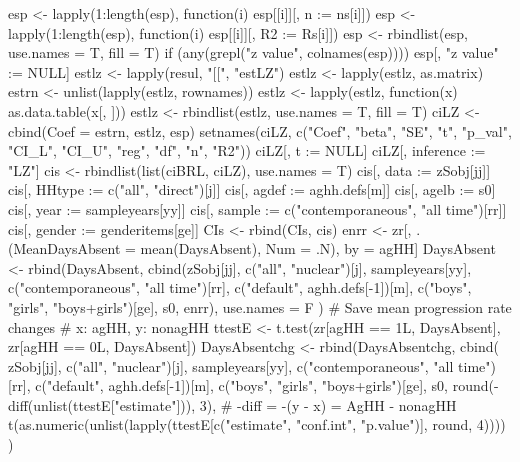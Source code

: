 \begin{Schunk}
\begin{Sinput}
{{{{{{{{                  esp <- lapply(1:length(esp), function(i) esp[[i]][, n := ns[i]])
                  esp <- lapply(1:length(esp), function(i) esp[[i]][, R2 := Rs[i]])
                  esp <- rbindlist(esp, use.names = T, fill = T)
                  if (any(grepl("z value", colnames(esp)))) esp[, "z value" := NULL]
                  estlz <- lapply(resul, "[[", "estLZ")
                  estlz <- lapply(estlz, as.matrix)
                  estrn <- unlist(lapply(estlz, rownames))
                  estlz <- lapply(estlz, function(x) as.data.table(x[, ]))
                  estlz <- rbindlist(estlz, use.names = T, fill = T)
                  ciLZ <- cbind(Coef = estrn, estlz, esp)
                  setnames(ciLZ,  c("Coef", "beta", "SE", "t", "p_val", "CI_L", "CI_U", "reg", "df", "n", "R2"))
                  ciLZ[, t := NULL]
                  ciLZ[, inference := "LZ"]
                  cis <- rbindlist(list(ciBRL, ciLZ), use.names = T)
                  cis[, data := zSobj[jj]]
                  cis[, HHtype := c("all", "direct")[j]]
                  cis[, agdef := aghh.defs[m]]
                  cis[, agelb := s0]
                  cis[, year := sampleyears[yy]]
                  cis[, sample := c("contemporaneous", "all time")[rr]]
                  cis[, gender := genderitems[ge]]
                  CIs <- rbind(CIs, cis)
                  enrr <- zr[, .(MeanDaysAbsent = mean(DaysAbsent), Num = .N), by = agHH]
                  DaysAbsent <- rbind(DaysAbsent, 
                    cbind(zSobj[jj], c("all", "nuclear")[j], 
                      sampleyears[yy], c("contemporaneous", "all time")[rr],
                      c("default", aghh.defs[-1])[m], 
                      c("boys", "girls", "boys+girls")[ge],
                      s0, enrr),
                    use.names = F
                  )
                  # Save mean progression rate changes
                  # x: agHH, y: nonagHH
                  ttestE <- t.test(zr[agHH == 1L, DaysAbsent], zr[agHH == 0L, DaysAbsent])
                  DaysAbsentchg <- rbind(DaysAbsentchg, 
                    cbind(
                        zSobj[jj], c("all", "nuclear")[j], 
                        sampleyears[yy], c("contemporaneous", "all time")[rr],
                        c("default", aghh.defs[-1])[m], 
                        c("boys", "girls", "boys+girls")[ge],
                        s0, round(-diff(unlist(ttestE["estimate"])), 3), # -diff = -(y - x) = AgHH - nonagHH
                        t(as.numeric(unlist(lapply(ttestE[c("estimate", "conf.int", "p.value")], round, 4))))
                        )
}}}}}}}}
\end{Sinput}
\end{Schunk}

